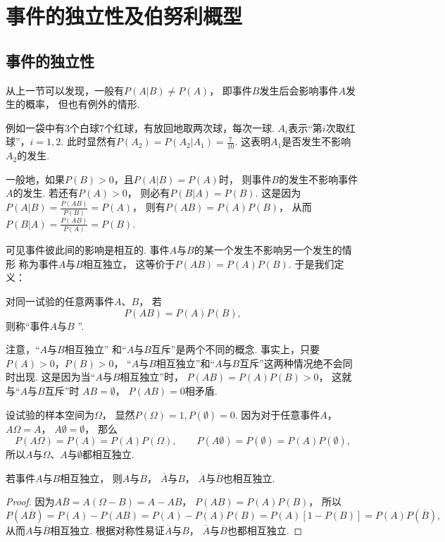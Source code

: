 \section{事件的独立性及伯努利概型}
\subsection{事件的独立性}
从上一节可以发现，一般有\(P(A \vert B) \neq P(A)\)，
即事件\(B\)发生后会影响事件\(A\)发生的概率，
但也有例外的情形.

例如一袋中有3个白球7个红球，有放回地取两次球，每次一球.
\(A_i\)表示“第\(i\)次取红球”，\(i=1,2\).
此时显然有\(P(A_2) = P(A_2 \vert A_1) = \frac{7}{10}\).
这表明\(A_1\)是否发生不影响\(A_2\)的发生.

一般地，如果\(P(B) > 0\)，且\(P(A \vert B) = P(A)\)时，
则事件\(B\)的发生不影响事件\(A\)的发生.
若还有\(P(A) > 0\)，
则必有\(P(B \vert A) = P(B)\).
这是因为\(P(A \vert B) = \frac{P(AB)}{P(B)} = P(A)\)，
则有\(P(AB) = P(A) P(B)\)，
从而\(P(B \vert A) = \frac{P(AB)}{P(A)} = P(B)\).

可见事件彼此间的影响是相互的.
事件\(A\)与\(B\)的某一个发生不影响另一个发生的情形
称为事件\(A\)与\(B\)相互独立，
这等价于\(P(AB) = P(A) P(B)\).
于是我们定义：

\begin{definition}
对同一试验的任意两事件\(A\)、\(B\)，
若\begin{equation*}
	P(AB) = P(A) P(B),
\end{equation*}
则称“事件\(A\)与\(B\) ”.
\end{definition}

注意，“\(A\)与\(B\)相互独立”
和“\(A\)与\(B\)互斥”是两个不同的概念.
事实上，只要\(P(A) > 0\)，\(P(B) > 0\)，
“\(A\)与\(B\)相互独立”和“\(A\)与\(B\)互斥”这两种情况绝不会同时出现.
这是因为当“\(A\)与\(B\)相互独立”时，
\(P(AB) = P(A) P(B) > 0\)，
这就与“\(A\)与\(B\)互斥”时
\(AB = \emptyset\)，
\(P(AB) = 0\)相矛盾.

设试验的样本空间为\(\Omega\)，
显然\(P(\Omega) = 1,
P(\emptyset) = 0\).
因为对于任意事件\(A\)，
\(A \Omega = A\)，
\(A \emptyset = \emptyset\)，
那么\begin{equation*}
	P(A \Omega) = P(A) = P(A) P(\Omega), \qquad
	P(A \emptyset) = P(\emptyset) = P(A) P(\emptyset),
\end{equation*}
所以\(A\)与\(\Omega\)、\(A\)与\(\emptyset\)都相互独立.

\begin{theorem}
若事件\(A\)与\(B\)相互独立，
则\(A\)与\(\overline{B}\)，
\(\overline{A}\)与\(B\)，
\(\overline{A}\)与\(\overline{B}\)也相互独立.
\begin{proof}
因为\(A\overline{B}=A(\Omega-B)=A-AB\)，
\(P(AB)=P(A)P(B)\)，
所以\begin{equation*}
	P(A\overline{B})
	= P(A) - P(AB)
	= P(A) - P(A) P(B)
	= P(A) [1 - P(B)]
	= P(A) P(\overline{B}),
\end{equation*}
从而\(A\)与\(\overline{B}\)相互独立.
根据对称性易证\(\overline{A}\)与\(B\)，
\(\overline{A}\)与\(\overline{B}\)也都相互独立.
\end{proof}
\end{theorem}

